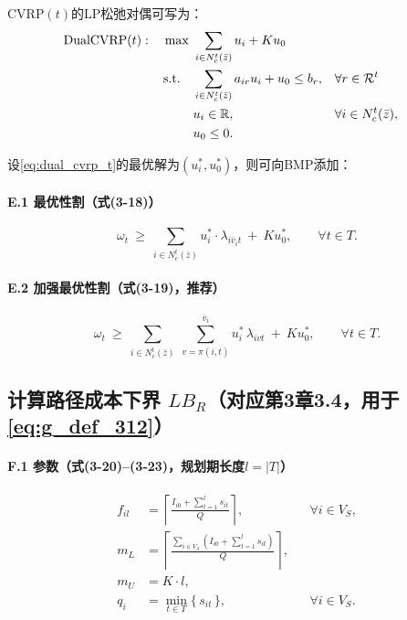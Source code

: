 \documentclass{article}
\begin{document}
CVRP$(t)$的LP松弛对偶可写为：
\begin{align}
\text{DualCVRP}(t):\quad
\max\ & \sum_{i\in N_c^t(\bar z)} u_i + K u_0 \notag\\
\text{s.t.}\quad
& \sum_{i\in N_c^t(\bar z)} a_{ir} u_i + u_0 \le b_r, && \forall r\in\mathcal R^t \notag\\
& u_i\in\mathbb R, && \forall i\in N_c^t(\bar z), \notag\\
& u_0\le 0 .
\label{eq:dual_cvrp_t}
\end{align}

设\eqref{eq:dual_cvrp_t}的最优解为$(u_i^*,u_0^*)$，则可向BMP添加：

\paragraph{E.1 最优性割（式(3-18)）}
\begin{equation}
\omega_t\ \ge\ \sum_{i\in N_c^t(\bar z)} u_i^*\cdot \lambda_{i\bar v_i t}\ +\ K u_0^*,
\qquad \forall t\in T.
\label{eq:opt_318}
\end{equation}

\paragraph{E.2 加强最优性割（式(3-19)，推荐）}
\begin{equation}
\omega_t\ \ge\ \sum_{i\in N_c^t(\bar z)}\ \sum_{v=\pi(i,t)}^{\bar v_i} u_i^*\,\lambda_{ivt}\ +\ K u_0^*,
\qquad \forall t\in T.
\label{eq:opt_319}
\end{equation}

\subsection{计算路径成本下界 $LB_R$（对应第3章3.4，用于\eqref{eq:g_def_312}）}

\paragraph{F.1 参数（式(3-20)--(3-23)，规划期长度$l=|T|$）}
\begin{align}
f_{il} &= \left\lceil \frac{I_{i0}+\sum_{t=1}^{l}s_{it}}{Q}\right\rceil, && \forall i\in V_S, \label{eq:param_320}\\
m_L &= \left\lceil \frac{\sum_{i\in V_S}\left(I_{i0}+\sum_{t=1}^{l}s_{it}\right)}{Q}\right\rceil, \label{eq:param_321}\\
m_U &= K\cdot l, \label{eq:param_322}\\
q_i &= \min_{t\in T}\{\,s_{it}\,\}, && \forall i\in V_S. \label{eq:param_323}
\end{align}
\end{document}

